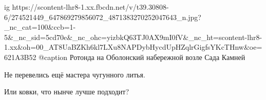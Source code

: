  
 
 
 
 

\ifcmt
  ig https://scontent-lhr8-1.xx.fbcdn.net/v/t39.30808-6/274521449_647869279856072_4871383270252047643_n.jpg?_nc_cat=100&ccb=1-5&_nc_sid=5cd70e&_nc_ohc=yizbkQ63TJ0AX9mI0fV&_nc_ht=scontent-lhr8-1.xx&oh=00_AT8UaBZKh6kl7LXu8NAPDybHycdUpHZqlrGigfsYKcTHnw&oe=621A3B52
	@caption Ротонда на Оболонский набережной возле Сада Камней
\fi

Не перевелись ещё мастера чугунного литья.

Или ковки, что нынче лучше подходит?
